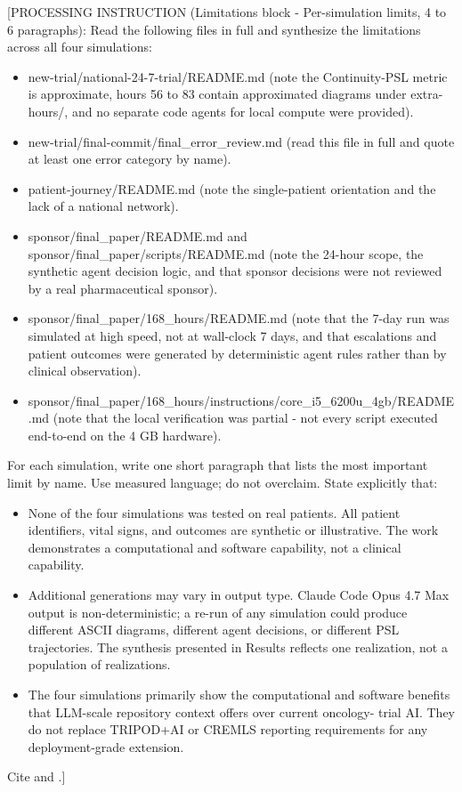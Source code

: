 
[PROCESSING INSTRUCTION (Limitations block - Per-simulation limits, 4 to
6 paragraphs): Read the following files in full and synthesize the
limitations across all four simulations:
\begin{itemize}[leftmargin=*]
\item new-trial/national-24-7-trial/README.md (note the Continuity-PSL
metric is approximate, hours 56 to 83 contain approximated diagrams under
extra-hours/, and no separate code agents for local compute were
provided).
\item new-trial/final-commit/final\_error\_review.md (read this file in
full and quote at least one error category by name).
\item patient-journey/README.md (note the single-patient orientation and
the lack of a national network).
\item sponsor/final\_paper/README.md and
sponsor/final\_paper/scripts/README.md (note the 24-hour scope, the
synthetic agent decision logic, and that sponsor decisions were not
reviewed by a real pharmaceutical sponsor).
\item sponsor/final\_paper/168\_hours/README.md (note that the 7-day run
was simulated at high speed, not at wall-clock 7 days, and that
escalations and patient outcomes were generated by deterministic agent
rules rather than by clinical observation).
\item sponsor/final\_paper/168\_hours/instructions/core\_i5\_6200u\_4gb/README.md
(note that the local verification was partial - not every script
executed end-to-end on the 4 GB hardware).
\end{itemize}

For each simulation, write one short paragraph that lists the most
important limit by name. Use measured language; do not overclaim. State
explicitly that:
\begin{itemize}[leftmargin=*]
\item None of the four simulations was tested on real patients. All
patient identifiers, vital signs, and outcomes are synthetic or
illustrative. The work demonstrates a computational and software
capability, not a clinical capability.
\item Additional generations may vary in output type. Claude Code Opus
4.7 Max output is non-deterministic; a re-run of any simulation could
produce different ASCII diagrams, different agent decisions, or different
PSL trajectories. The synthesis presented in Results reflects one
realization, not a population of realizations.
\item The four simulations primarily show the computational and software
benefits that LLM-scale repository context offers over current oncology-
trial AI. They do not replace TRIPOD+AI or CREMLS reporting requirements
for any deployment-grade extension.
\end{itemize}
Cite \cite{Collins2024TRIPODAI} and \cite{ElEmam2024CREMLS}.]

